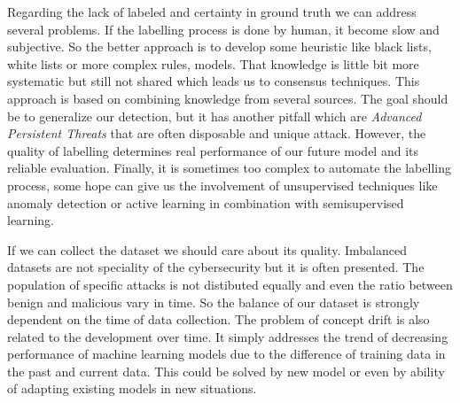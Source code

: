 Regarding the lack of labeled and certainty in ground truth we can address several problems. If the labelling process is done by human, it become slow and subjective. So the better approach is to develop some heuristic like black lists, white lists or more complex rules, models. That knowledge is little bit more systematic but still not shared which leads us to consensus techniques. This approach is based on combining knowledge from several sources. The goal should be to generalize our detection, but it has another pitfall which are \emph{Advanced Persistent Threats} that are often disposable and unique attack. However, the quality of labelling determines real performance of our future model and its reliable evaluation. Finally, it is sometimes too complex to automate the labelling process, some hope can give us the involvement of unsupervised techniques like anomaly detection or active learning in combination with semisupervised learning.

If we can collect the dataset we should care about its quality. Imbalanced datasets are not speciality of the cybersecurity but it is often presented. The population of specific attacks is not distibuted equally and even the ratio between benign and malicious vary in time. So the balance of our dataset is strongly dependent on the time of data collection. The problem of concept drift is also related to the development over time. It simply addresses the trend of decreasing performance of machine learning models due to the difference of training data in the past and current data. This could be solved by new model or even by ability of adapting existing models in new situations.




